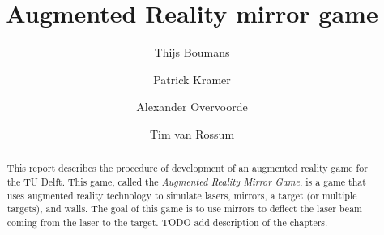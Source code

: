 \documentclass[]{report}
\title{Augmented Reality mirror game}
\author{Thijs Boumans \and Patrick Kramer \and
        Alexander Overvoorde \and Tim van Rossum}
\begin{document}
\maketitle

\begin{abstract}
This report describes the procedure of development of an augmented reality game for the TU Delft.
This game, called the \emph{Augmented Reality Mirror Game}, is a game that uses augmented reality 
technology to simulate lasers, mirrors, a target (or multiple targets), and walls. The goal of 
this game is to use mirrors to deflect the laser beam coming from the laser to the target. TODO add description of the chapters.
\end{abstract}



\end{document}
